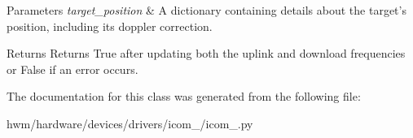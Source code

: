 \begin{DoxyParams}{Parameters}
{\em target\-\_\-position} & A dictionary containing details about the target's position, including its doppler correction. \\
\hline
\end{DoxyParams}
\begin{DoxyReturn}{Returns}
Returns True after updating both the uplink and download frequencies or False if an error occurs. 
\end{DoxyReturn}


The documentation for this class was generated from the following file\-:\begin{DoxyCompactItemize}
\item 
hwm/hardware/devices/drivers/icom\-\_/icom\-\_.\-py\end{DoxyCompactItemize}
